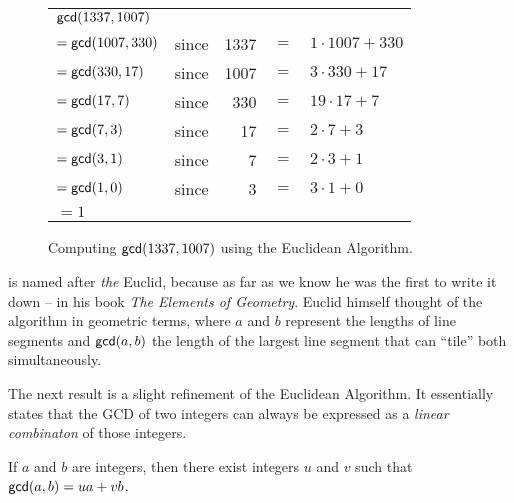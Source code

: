 \begin{figure}[h]
\begin{center}
\begin{tabular}{lcrcl}
\(\mathsf{gcd}(1337, 1007)\) & & \\
 \(= \mathsf{gcd}(1007, 330)\) & since & 1337 & \(=\) & \(1 \cdot 1007 + 330\) \\
 \(= \mathsf{gcd}(330, 17)\)   & since & 1007 & \(=\) & \(3 \cdot 330 + 17\) \\
 \(= \mathsf{gcd}(17, 7)\)     & since & 330  & \(=\) & \(19 \cdot 17 + 7\) \\
 \(= \mathsf{gcd}(7, 3)\)      & since & 17   & \(=\) & \(2 \cdot 7 + 3\) \\
 \(= \mathsf{gcd}(3, 1)\)      & since & 7    & \(=\) & \(2 \cdot 3 + 1\) \\
 \(= \mathsf{gcd}(1, 0)\)      & since & 3    & \(=\) & \(3 \cdot 1 + 0\) \\
 \(= 1\) & & & & \\
\end{tabular}
\caption{\label{fig:euclid-alg-example}Computing \(\mathsf{gcd}(1337, 1007)\) using the Euclidean Algorithm.}
\end{center}
\end{figure}

 is named after \emph{the} Euclid, because as far as we know he was the first to write it down -- in his book \emph{The Elements of Geometry}.
Euclid himself thought of the algorithm in geometric terms, where \(a\) and \(b\) represent the lengths of line segments and \(\mathsf{gcd}(a, b)\) the length of the largest line segment that can ``tile'' both simultaneously.

The next result is a slight refinement of the Euclidean Algorithm.
It essentially states that the GCD of two integers can always be expressed as a \emph{linear combinaton} of those integers.

\begin{prop}
If \(a\) and \(b\) are integers, then there exist integers \(u\) and \(v\) such that \(\mathsf{gcd}(a, b) = ua + vb\).
\end{prop}

